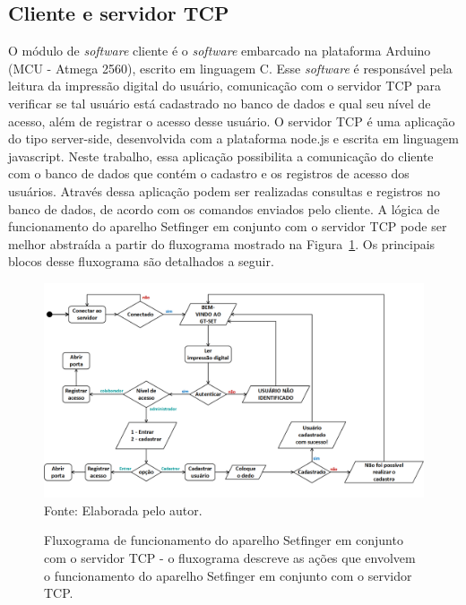 \subsection{Cliente e servidor TCP}

O módulo de \textit{software} cliente é o \textit{software} embarcado na plataforma Arduino (MCU - Atmega 2560), escrito em linguagem C. Esse \textit{software} é responsável pela leitura da impressão digital do usuário, comunicação com o servidor TCP para verificar se tal usuário está cadastrado no banco de dados e qual seu nível de acesso, além de registrar o acesso desse usuário. O servidor TCP é uma aplicação do tipo server-side, desenvolvida com a plataforma node.js e escrita em linguagem javascript. Neste trabalho, essa aplicação possibilita a comunicação do cliente com o banco de dados que contém o cadastro e os registros de acesso dos usuários. Através dessa aplicação podem ser realizadas consultas e registros no banco de dados, de acordo com os comandos enviados pelo cliente. A lógica de funcionamento do aparelho Setfinger em conjunto com o servidor TCP pode ser melhor abstraída a partir do fluxograma mostrado na Figura~\ref{fluxograma_cliente-servidor}. Os principais blocos desse fluxograma são detalhados a seguir.

  
 \begin{figure}[!t]
 \begin{center}
  \caption{Fluxograma de funcionamento do aparelho Setfinger em conjunto com o servidor TCP - o fluxograma descreve as ações que envolvem o funcionamento do aparelho Setfinger em conjunto com o servidor TCP.}
  \includegraphics[scale=0.39]{figuras/cap4/fluxograma_cliente-servidor.png}\\
  Fonte: Elaborada pelo autor.
  \label{fluxograma_cliente-servidor}
  \end{center}
 \end{figure}
  
